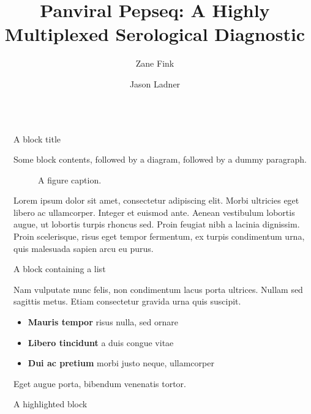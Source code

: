 \documentclass[final]{beamer}
\title{Panviral Pepseq: A Highly Multiplexed Serological Diagnostic }
\author{Zane Fink\inst{1} \and Jason Ladner\inst{1}}
\institute[shortinst]{\inst{1} The Pathogen and Microbiome Institute at Northern Arizona University}
\newlength{\sepwidth}
\newlength{\colwidth}
\newcommand{\separatorcolumn}{\begin{column}{\sepwidth}\end{column}}
\begin{document}
\begin{frame}[t]
\begin{columns}[t]
\separatorcolumn

\begin{column}{\colwidth}

  \begin{block}{A block title}

    Some block contents, followed by a diagram, followed by a dummy paragraph.

    \begin{figure}
      \centering
      \caption{A figure caption.}
    \end{figure}

    Lorem ipsum dolor sit amet, consectetur adipiscing elit. Morbi ultricies
    eget libero ac ullamcorper. Integer et euismod ante. Aenean vestibulum
    lobortis augue, ut lobortis turpis rhoncus sed. Proin feugiat nibh a
    lacinia dignissim. Proin scelerisque, risus eget tempor fermentum, ex
    turpis condimentum urna, quis malesuada sapien arcu eu purus.

  \end{block}

  \begin{block}{A block containing a list}

    Nam vulputate nunc felis, non condimentum lacus porta ultrices. Nullam sed
    sagittis metus. Etiam consectetur gravida urna quis suscipit.

    \begin{itemize}
      \item \textbf{Mauris tempor} risus nulla, sed ornare
      \item \textbf{Libero tincidunt} a duis congue vitae
      \item \textbf{Dui ac pretium} morbi justo neque, ullamcorper
    \end{itemize}

    Eget augue porta, bibendum venenatis tortor.

  \end{block}

  \begin{alertblock}{A highlighted block}


\end{alertblock}
\end{column}
\end{columns}
\end{frame}
\end{document}
